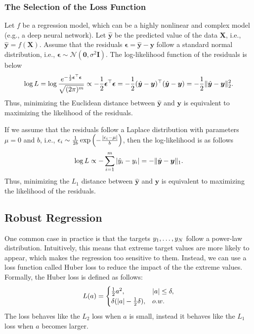     \subsubsection{The Selection of the Loss Function}  
        Let $f$ be a regression model, which can be a highly nonlinear and complex model (e.g., a deep neural network).
        Let $\hat{\bm{y}}$ be the predicted value of the data $\bm{X}$, i.e., $\hat{\bm{y}} = f(\bm{X})$.
        Assume that the residuals $\bm{\epsilon} = \hat{\bm{y}} - \bm{y}$ follow a standard normal distribution, i.e., $\bm{\epsilon} \sim \mathcal{N}(\bm{0}, \sigma^2 \bm{I})$.
        The log-likelihood function of the residuals is below
            \begin{equation}
                \log L = \log{ \frac{ e^{-\frac{1}{2} \bm{\epsilon}^\top \bm{\epsilon}} }{\sqrt{(2\pi)^m }}} \propto -\frac{1}{2} \bm{\epsilon}^\top \bm{\epsilon} = -\frac{1}{2}(\hat{\bm{y}} - \bm{y})^\top (\hat{\bm{y}} - \bm{y}) = -\frac{1}{2} \lVert\hat{\bm{y}} - \bm{y}\rVert^2_2 .
            \end{equation}
        Thus, minimizing the Euclidean distance between $\hat{\bm{y}}$ and $\bm{y}$ is equivalent to maximizing  the likelihood of the residuals.
        
        If we assume that the residuals follow a Laplace distribution with parameters $\mu=0$ and $b$, i.e., $\epsilon_i \sim \frac{1}{2b} \exp{\left( -\frac{\ensuremath{| \epsilon_i - \mu |}}{b}\right)}$, then the log-likelihood is as follows
            \begin{equation}
                \log L \propto  -\sum_{i=1}^{m}{| \hat{y}_i - y_i |} = - \lVert\hat{\bm{y}} - \bm{y}\rVert_1.
            \end{equation}
        Thus, minimizing the $L_1$ distance between $\hat{\bm{y}}$ and $\bm{y}$ is equivalent to maximizing  the likelihood of the residuals.
        

    \subsection{Robust Regression}
        One common case in practice is that the targets $y_1, \ldots, y_{N}$ follow a power-law distribution. 
        Intuitively, this means that extreme target values are more likely to appear, which makes the regression too sensitive to them.
        Instead, we can use a loss function called Huber loss to reduce the impact of the the extreme values.
        Formally, the Huber loss is defined as follows:
            \begin{equation}
                L(a) = \begin{cases}
                            \frac{1}{2} a^2 , &| a | \le \delta, \\
                            \delta (| a | - \frac{1}{2}\delta) , & o.w.
                       \end{cases}
            \end{equation}
        The loss behaves like the $L_2$ loss when $a$ is small, instead it behaves like the $L_1$ loss when $a$ becomes larger. 
        

